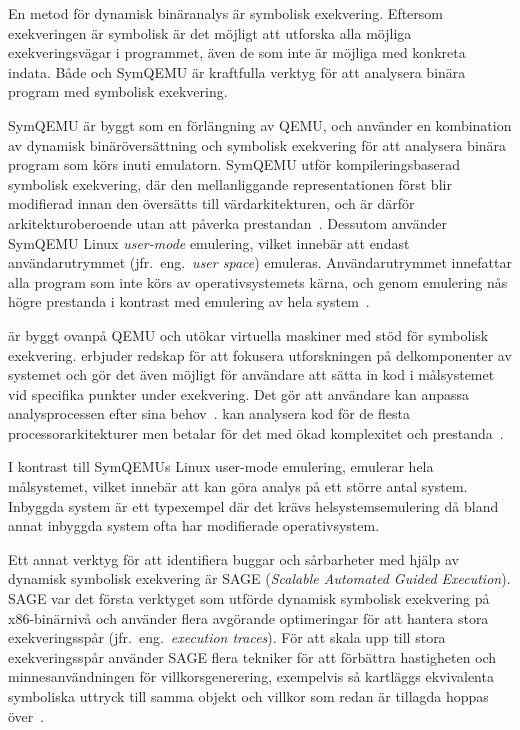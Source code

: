 En metod för dynamisk binäranalys är symbolisk exekvering. Eftersom exekveringen är symbolisk är
det möjligt att utforska alla möjliga exekveringsvägar i programmet, även de som inte är möjliga
med konkreta indata. Både \stoe{} och SymQEMU är kraftfulla verktyg för att analysera binära program
med symbolisk exekvering.

SymQEMU är byggt som en förlängning av QEMU, och använder en kombination av
dynamisk binäröversättning och symbolisk exekvering för att analysera binära
program som körs inuti emulatorn. SymQEMU utför kompileringsbaserad symbolisk
exekvering, där den mellanliggande representationen först blir modifierad innan
den översätts till värdarkitekturen, och är därför arkitekturoberoende utan att
påverka prestandan~\cite{symqemu}. Dessutom använder SymQEMU Linux \emph{user-mode}
emulering, vilket innebär att endast användarutrymmet (jfr.\ eng.\ \emph{user space})
emuleras. Användarutrymmet innefattar alla program som inte körs av
operativsystemets kärna, och genom emulering nås högre prestanda i kontrast med
emulering av hela system~\cite{symqemu}.

\stoe{} är byggt ovanpå QEMU och utökar virtuella maskiner med stöd för
symbolisk exekvering. \stoe{} erbjuder redskap för att fokusera utforskningen på
delkomponenter av systemet och gör det även möjligt för användare att sätta in
kod i målsystemet vid specifika punkter under exekvering. Det gör att användare
kan anpassa analysprocessen efter sina behov~\cite{s2e}. \stoe{} kan analysera
kod för de flesta processorarkitekturer men betalar för det med ökad komplexitet
och prestanda~\cite{symqemu}.

I kontrast till SymQEMUs Linux user-mode emulering, emulerar \stoe{} hela
målsystemet, vilket innebär att \stoe{} kan göra analys på ett större antal
system. Inbyggda system är ett typexempel där det krävs helsystemsemulering då
bland annat inbyggda system ofta har modifierade operativsystem.

Ett annat verktyg för att identifiera buggar och sårbarheter med hjälp av dynamisk symbolisk
exekvering är SAGE (\emph{Scalable Automated Guided Execution}).
SAGE var det första verktyget som utförde dynamisk symbolisk exekvering på x86-binärnivå och använder flera
avgörande optimeringar för att hantera stora exekveringsspår (jfr.\ eng.\ \emph{execution traces}).
För att skala upp till stora exekveringsspår använder SAGE flera tekniker för att förbättra hastigheten och
minnesanvändningen för villkorsgenerering, exempelvis så kartläggs ekvivalenta symboliska uttryck till samma
objekt och villkor som redan är tillagda hoppas över~\cite{sage}.

